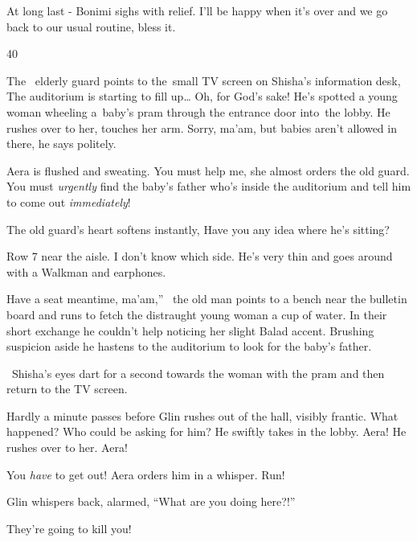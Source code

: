 \documentclass[letterpaper]{article}
\begin{document}
{\textquotedbl}At long last -{\textquotedbl} Bonimi sighs with relief. {\textquotedbl}I'll be happy when it's over and
we go back to our usual routine, bless it.{\textquotedbl}


\bigskip

40 

The ~elderly guard points to the~small TV screen on Shisha's information desk, {\textquotedbl}The auditorium is starting
to fill up{\dots} Oh, for God's sake!{\textquotedbl} He's spotted a young woman wheeling a~baby's pram through the
entrance door into~the lobby. He rushes\textcolor[rgb]{0.0,0.4392157,0.7529412}{ }over to her, touches her arm.
{\textquotedbl}Sorry, ma'am, but babies aren't allowed in there,{\textquotedbl} he says politely.

Aera is flushed and sweating. {\textquotedbl}You must help me,{\textquotedbl} she almost orders the old guard.
{\textquotedbl}You must \textit{urgently} find the baby's father who's inside the auditorium and tell him to come out
\textit{immediately}!{\textquotedbl} 

The old guard's heart softens instantly, {\textquotedbl}Have you any idea where he's sitting?{\textquotedbl}

{\textquotedbl}Row 7 near the aisle. I don't know which side. He's very thin and goes around with a Walkman and
earphones.{\textquotedbl} 

{\textquotedbl}Have a seat meantime, ma'am,'' \ the old man points to a bench near the bulletin board and runs to fetch
the distraught young woman a cup of water. In their short exchange he couldn't help noticing her slight Balad accent.
Brushing suspicion aside he hastens to the auditorium to look for the baby's father.

~Shisha's eyes dart for a second towards the woman with\textcolor[rgb]{0.0,0.4392157,0.7529412}{ }the pram and then
return to the TV screen.

Hardly a minute passes before Glin rushes out of the hall, visibly frantic. What happened? Who could be asking for him?
He swiftly takes in the lobby. Aera! He rushes over to her. {\textquotedbl}Aera!{\textquotedbl} 

{\textquotedbl}You \textit{have} to get out!{\textquotedbl} Aera orders him in a whisper.
{\textquotedbl}Run!{\textquotedbl} 

Glin whispers back, alarmed\textcolor[rgb]{0.0,0.4392157,0.7529412}{, }{}``What are you doing here?!'' 

{\textquotedbl}They're going to kill you!{\textquotedbl}
\end{document}
